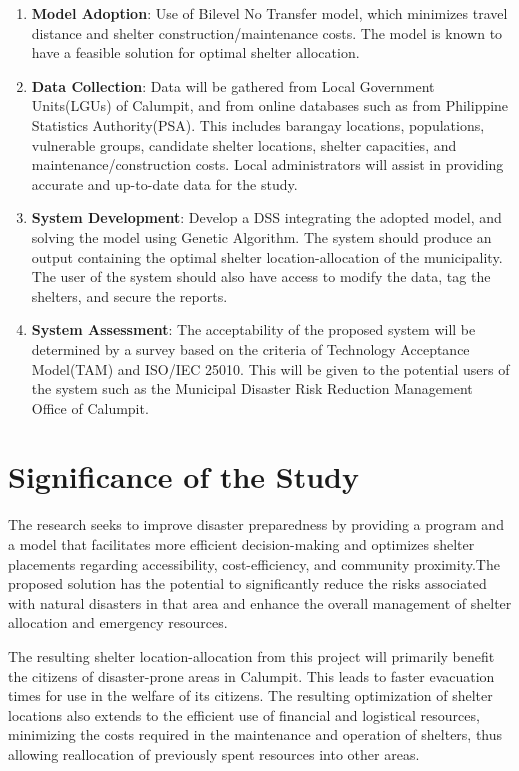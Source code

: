 	\begin{enumerate}
		\item \textbf{Model Adoption}: Use of Bilevel No Transfer model, which minimizes travel distance and shelter construction/maintenance costs. The model is known to have a feasible solution for optimal shelter allocation.

		\item \textbf{Data Collection}: Data will be gathered from Local Government Units(LGUs) of Calumpit, and from online databases such as from Philippine Statistics Authority(PSA). This includes barangay locations, populations, vulnerable groups, candidate shelter locations, shelter capacities, and maintenance/construction costs. Local administrators will assist in providing accurate and up-to-date data for the study.
		
		\item \textbf{System Development}: Develop a DSS integrating the adopted model, and solving the model using Genetic Algorithm. The system should produce an output containing the optimal shelter location-allocation of the municipality. The user of the system should also have access to modify the data, tag the shelters, and secure the reports.
		
		\item \textbf{System Assessment}: The acceptability of the proposed system will be determined by a survey based on the criteria of Technology Acceptance Model(TAM) and ISO/IEC 25010. This will be given to the potential users of the system such as the Municipal Disaster Risk Reduction Management Office of Calumpit.
		
	\end{enumerate}

\section{Significance of the Study}
	The research seeks to improve disaster preparedness by providing a program and a model that facilitates more efficient decision-making and optimizes shelter placements regarding accessibility, cost-efficiency, and community proximity.The proposed solution has the potential to significantly reduce the risks associated with natural disasters in that area and enhance the overall management of shelter allocation and emergency resources.
	
	The resulting shelter location-allocation from this project will primarily benefit the citizens of disaster-prone areas in Calumpit. This leads to faster evacuation times for use in the welfare of its citizens. The resulting optimization of shelter locations also extends to the efficient use of financial and logistical resources, minimizing the costs required in the maintenance and operation of shelters, thus allowing reallocation of previously spent resources into other areas.
	
